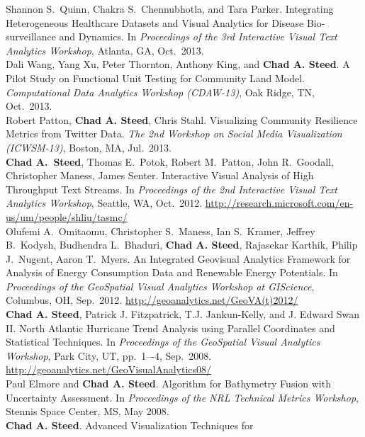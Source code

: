 \documentclass[11pt, a4paper]{article}
\newcommand{\years}[1]{\marginnote{\scriptsize #1}}
\begin{document}
\begin{sloppypar}
Shannon S.\ Quinn, Chakra S.\ Chennubhotla, and Tara Parker.
Integrating Heterogeneous Healthcare Datasets and Visual Analytics for Disease
Bio-surveillance and Dynamics. In \emph{Proceedings of the 3rd Interactive
Visual Text Analytics Workshop}, Atlanta, GA, Oct.\ 2013.\\
\years{2013}Dali Wang, Yang Xu, Peter Thornton, Anthony King,
and \textbf{Chad A. Steed}. A Pilot Study on Functional Unit Testing for
Community Land Model. \emph{Computational Data Analytics Workshop (CDAW-13)},
Oak Ridge, TN, Oct.\ 2013.\\
\years{2013}Robert Patton, \textbf{Chad A. Steed}, Chris Stahl.
Visualizing Community Resilience Metrics from Twitter Data. \emph{The 2nd Workshop
on Social Media Visualization (ICWSM-13)}, Boston, MA, Jul.\ 2013.\\
\years{2012}\textbf{Chad A.\ Steed}, Thomas E.\ Potok, Robert M.\ Patton,
John R.\ Goodall, Christopher Maness, James Senter.  Interactive Visual Analysis
of High Throughput Text Streams. In \emph{Proceedings of the 2nd Interactive
Visual Text Analytics Workshop}, Seattle, WA, Oct.\ 2012.
\href{http://research.microsoft.com/en-us/um/people/shliu/tasmc/}
{http://research.microsoft.com/en-us/um/people/shliu/tasmc/}\\
\years{2012}Olufemi A.\ Omitaomu, Christopher S.\ Maness, Ian S.\ Kramer,
Jeffrey B.\ Kodysh, Budhendra L.\ Bhaduri, \textbf{Chad A. Steed},
Rajasekar Karthik, Philip J.\ Nugent, Aaron T.\ Myers. An Integrated Geovisual
Analytics Framework for Analysis of Energy Consumption Data and Renewable
Energy Potentials. In \emph{Proceedings of the GeoSpatial Visual Analytics Workshop at
GIScience}, Columbus, OH, Sep.\ 2012.
\href{http://geoanalytics.net/GeoVA(t)2012/}{http://geoanalytics.net/GeoVA(t)2012/}\\
\years{2009}\textbf{Chad A. Steed}, Patrick J. Fitzpatrick, T.J.
Jankun-Kelly, and J. Edward Swan II. North Atlantic Hurricane Trend Analysis
using Parallel Coordinates and Statistical Techniques.  In \emph{Proceedings of
the GeoSpatial Visual Analytics Workshop}, Park City, UT, pp.\ 1–-4, Sep.\ 2008.
\href{http://geoanalytics.net/GeoVisualAnalytics08/}
{http://geoanalytics.net/GeoVisualAnalytics08/}\\
\years{2008}Paul Elmore and \textbf{Chad A. Steed}.  Algorithm for Bathymetry
Fusion with Uncertainty Assessment.  In \emph{Proceedings of the NRL Technical
Metrics Workshop}, Stennis Space Center, MS, May 2008.\\
\years{2008}\textbf{Chad A. Steed}.  Advanced Visualization Techniques for

\end{sloppypar}
\end{document}
